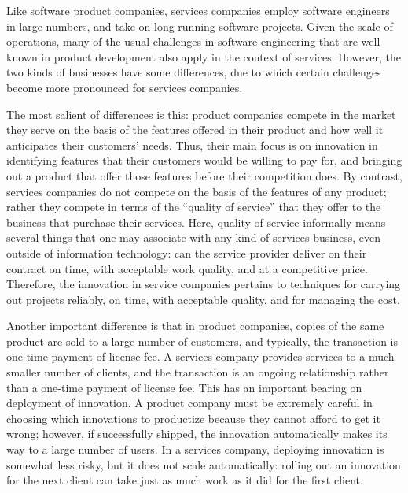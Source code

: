 Like software product companies, services companies employ software engineers in
large numbers, and take on long-running software projects. Given the scale of
operations, many of the usual challenges in software engineering that are well
known in product development also apply in the context of services.  However,
the two kinds of businesses have some differences, due to which certain
challenges become more pronounced for services companies.

The most salient of differences is this: product companies compete in the market
they serve on the basis of the features offered in their product and how well it
anticipates their customers' needs. Thus, their main focus is on innovation in
identifying features that their customers would be willing to pay for, and
bringing out a product that offer those features before their competition
does. By contrast, services companies do not compete on the basis of the
features of any product; rather they compete in terms of the ``quality of
service'' that they offer to the business that purchase their services. Here,
quality of service informally means several things that one may associate with
any kind of services business, even outside of information technology: can the
service provider deliver on their contract on time, with acceptable work
quality, and at a competitive price.  Therefore, the innovation in service
companies pertains to techniques for carrying out projects reliably, on time,
with acceptable quality, and for managing the cost.

Another important difference is that in product companies, copies of the same
product are sold to a large number of customers, and typically, the transaction
is one-time payment of license fee.  A services company provides services to a
much smaller number of clients, and the transaction is an ongoing relationship
rather than a one-time payment of license fee. This has an important bearing on
deployment of innovation.  A product company must be extremely careful in
choosing which innovations to productize because they cannot afford to get it
wrong; however, if successfully shipped, the innovation automatically makes its
way to a large number of users.  In a services company, deploying innovation is
somewhat less risky, but it does not scale automatically: rolling out an
innovation for the next client can take just as much work as it did for the
first client.


